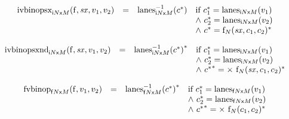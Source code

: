 $$
\begin{array}[t]{@{}lcl@{}l@{}}
{{\mathrm{ivbinopsx}}}_{{{\mathsf{i}}{N}}{\mathsf{x}}{M}}({\mathrm{f}}, {\mathit{sx}}, v_1, v_2) & = & {{{{\mathrm{lanes}}}_{{{\mathsf{i}}{N}}{\mathsf{x}}{M}}^{{-1}}}}{({c^\ast})} & \quad
\begin{array}[t]{@{}l@{}}
\mbox{if}~ {c_1^\ast} = {{\mathrm{lanes}}}_{{{\mathsf{i}}{N}}{\mathsf{x}}{M}}(v_1) \\
{\land}~ {c_2^\ast} = {{\mathrm{lanes}}}_{{{\mathsf{i}}{N}}{\mathsf{x}}{M}}(v_2) \\
{\land}~ {c^\ast} = {{{\mathrm{f}}}_{N}({\mathit{sx}}, c_1, c_2)^\ast} \\
\end{array} \\
\end{array}
$$

$$
\begin{array}[t]{@{}lcl@{}l@{}}
{{\mathrm{ivbinopsxnd}}}_{{{\mathsf{i}}{N}}{\mathsf{x}}{M}}({\mathrm{f}}, {\mathit{sx}}, v_1, v_2) & = & {{{{{\mathrm{lanes}}}_{{{\mathsf{i}}{N}}{\mathsf{x}}{M}}^{{-1}}}}{({c^\ast})}^\ast} & \quad
\begin{array}[t]{@{}l@{}}
\mbox{if}~ {c_1^\ast} = {{\mathrm{lanes}}}_{{{\mathsf{i}}{N}}{\mathsf{x}}{M}}(v_1) \\
{\land}~ {c_2^\ast} = {{\mathrm{lanes}}}_{{{\mathsf{i}}{N}}{\mathsf{x}}{M}}(v_2) \\
{\land}~ {{c^\ast}^\ast} = {\Large\times}~{{{\mathrm{f}}}_{N}({\mathit{sx}}, c_1, c_2)^\ast} \\
\end{array} \\
\end{array}
$$

$$
\begin{array}[t]{@{}lcl@{}l@{}}
{{\mathrm{fvbinop}}}_{{{\mathsf{f}}{N}}{\mathsf{x}}{M}}({\mathrm{f}}, v_1, v_2) & = & {{{{{\mathrm{lanes}}}_{{{\mathsf{f}}{N}}{\mathsf{x}}{M}}^{{-1}}}}{({c^\ast})}^\ast} & \quad
\begin{array}[t]{@{}l@{}}
\mbox{if}~ {c_1^\ast} = {{\mathrm{lanes}}}_{{{\mathsf{f}}{N}}{\mathsf{x}}{M}}(v_1) \\
{\land}~ {c_2^\ast} = {{\mathrm{lanes}}}_{{{\mathsf{f}}{N}}{\mathsf{x}}{M}}(v_2) \\
{\land}~ {{c^\ast}^\ast} = {\Large\times}~{{{\mathrm{f}}}_{N}(c_1, c_2)^\ast} \\
\end{array} \\
\end{array}
$$

